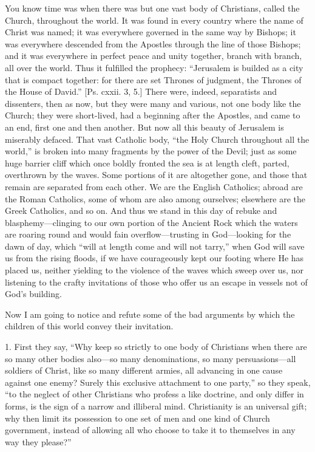 You know time was when there was but one vast body of Christians,
called the Church, throughout the world. It was found in every country
where the name of Christ was named; it was everywhere governed in the
same way by Bishops; it was everywhere descended from the Apostles
through the line of those Bishops; and it was everywhere in perfect
peace and unity together, branch with branch, all over the world. Thus
it fulfilled the prophecy: ``Jerusalem is builded as a city that
is compact together: for there are set Thrones of judgment, the
Thrones of the House of David.'' [Ps. cxxii. 3, 5.] There were,
indeed, separatists and dissenters, then as now, but they were many
and various, not one body like the Church; they were short-lived, had
a beginning after the Apostles, and came to an end, first one and then
another. But now all this beauty of Jerusalem is miserably defaced.
That vast Catholic body, ``the Holy Church throughout all the
world,'' is broken into many fragments by the power of the Devil;
just as some huge barrier cliff which once boldly fronted the sea is
at length cleft, parted, overthrown by the waves. Some portions of it
are altogether gone, and those that remain are separated from each
other. We are the English Catholics; abroad are the Roman Catholics,
some of whom are also among ourselves; elsewhere are the Greek
Catholics, and so on. And thus we stand in this day of rebuke and
blasphemy—clinging to our own portion of the Ancient Rock which the
waters are roaring round and would fain overflow—trusting in God—looking
for the dawn of day, which ``will at length come and will not
tarry,'' when God will save us from the rising floods, if we have
courageously kept our footing where He has placed us, neither yielding
to the violence of the waves which sweep over us, nor listening to the
crafty invitations of those who offer us an escape in vessels not of
God's building.

Now I am going to notice and refute some of the bad arguments by
which the children of this world convey their invitation.

1. First they say, ``Why keep so strictly to one body of
Christians when there are so many other bodies also—so many
denominations, so many persuasions—all soldiers of Christ, like so
many different armies, all advancing in one cause against one enemy?
Surely this exclusive attachment to one party,'' so they speak,
``to the neglect of other Christians who profess a like doctrine,
and only differ in forms, is the sign of a narrow and illiberal mind.
Christianity is an universal gift; why then limit its possession to
one set of men and one kind of Church government, instead of allowing
all who choose to take it to themselves in any way they please?''

